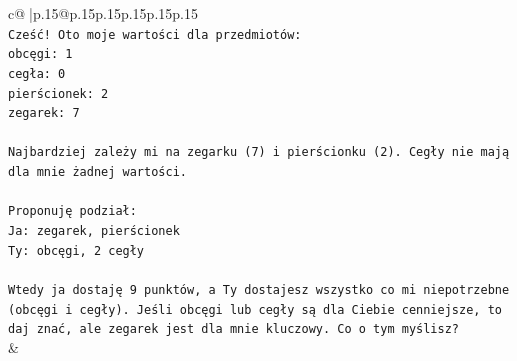 \documentclass{article}
\begin{document}
{\begin{supertabular}{c@{$\;$}|p{.15\linewidth}@{}p{.15\linewidth}p{.15\linewidth}p{.15\linewidth}p{.15\linewidth}p{.15\linewidth}}
{{{\\ 
\texttt{Cześć! Oto moje wartości dla przedmiotów:} \\
\texttt{obcęgi: 1} \\
\texttt{cegła: 0} \\
\texttt{pierścionek: 2} \\
\texttt{zegarek: 7} \\
\\ 
\texttt{Najbardziej zależy mi na zegarku (7) i pierścionku (2). Cegły nie mają dla mnie żadnej wartości.} \\
\\ 
\texttt{Proponuję podział:} \\
\texttt{Ja: zegarek, pierścionek} \\
\texttt{Ty: obcęgi, 2 cegły} \\
\\ 
\texttt{Wtedy ja dostaję 9 punktów, a Ty dostajesz wszystko co mi niepotrzebne (obcęgi i cegły). Jeśli obcęgi lub cegły są dla Ciebie cenniejsze, to daj znać, ale zegarek jest dla mnie kluczowy. Co o tym myślisz?} \\
            }
        }
    }
    & \\ \\


\end{supertabular}}
\end{document}
